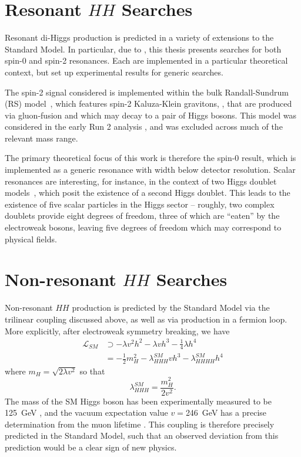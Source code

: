 \section{Resonant $HH$ Searches}
Resonant di-Higgs production is predicted in a variety of extensions to the
Standard Model. In particular, due to , this thesis presents
searches for both spin-0 and spin-2 resonances. Each are implemented in a particular 
theoretical context, but set up experimental results for generic searches.

The spin-2 signal considered is implemented within the bulk Randall-Sundrum (RS)
model~\cite{Gravitons}, which features spin-2 Kaluza-Klein gravitons,
\PGrav, that are produced via gluon-fusion and which may decay to a pair of Higgs bosons.
This model was considered in the early Run 2 analysis , and was excluded 
across much of the relevant mass range. 

The primary theoretical focus of this work is therefore the spin-0 result, which 
is implemented as a generic resonance with width below detector resolution. Scalar 
resonances are interesting, for instance, in the context of two Higgs doublet models~\cite{2HDM}, which 
posit the existence of a second Higgs doublet. This leads to the existence of five scalar
particles in the Higgs sector -- roughly, two complex doublets provide eight degrees of freedom, three of 
which are ``eaten'' by the electroweak bosons, leaving five degrees of freedom which may correspond
to physical fields.


\section{Non-resonant $HH$ Searches}
Non-resonant $HH$ production is predicted by the Standard Model via the trilinear coupling discussed above,
as well as via production in a fermion loop. More explicitly, after electroweak symmetry breaking, we have 
\begin{align}
\mathcal{L}_{SM} &\supset -\lambda v^2h^2 - \lambda v h^3 - \frac{1}{4}\lambda h^4\\
&= -\frac{1}{2}m_{H}^2 - \lambda_{HHH}^{SM}vh^3 - \lambda_{HHHH}^{SM}h^4
\end{align}
where $m_{H} = \sqrt{2\lambda v^2}$ so that 
\begin{equation}
\lambda_{HHH}^{SM} = \frac{m_{H}^2}{2v^2}.
\end{equation}
The mass of the SM Higgs boson has been experimentally measured to be \SI{125}{\GeV} , and 
the vacuum expectation value $v=$\SI{246}{\GeV} has a precise determination from the muon lifetime . 
This coupling is therefore precisely predicted in the Standard Model, such that an observed deviation from 
this prediction would be a clear sign of new physics. 


